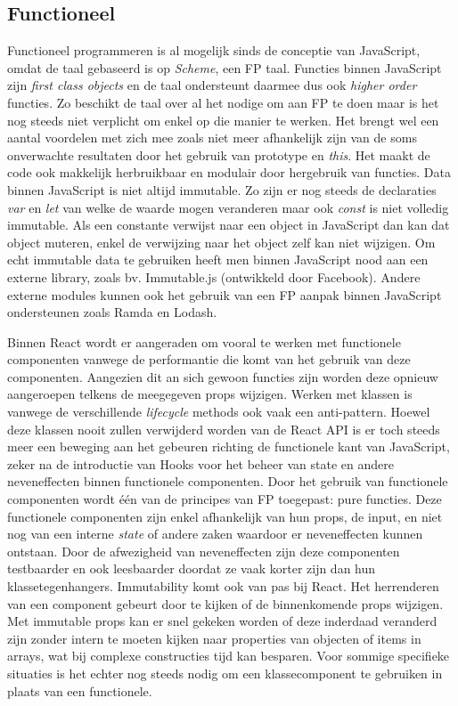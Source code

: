 \subsection{Functioneel}
Functioneel programmeren is al mogelijk sinds de conceptie van JavaScript, omdat de taal gebaseerd is op \textit{Scheme}, een FP taal. Functies binnen JavaScript zijn \textit{first class objects} en de taal ondersteunt daarmee dus ook \textit{higher order} functies. Zo beschikt de taal over al het nodige om aan FP te doen maar is het nog steeds niet verplicht om enkel op die manier te werken. Het brengt wel een aantal voordelen met zich mee zoals niet meer afhankelijk zijn van de soms onverwachte resultaten door het gebruik van prototype en \textit{this}. Het maakt de code ook makkelijk herbruikbaar en modulair door hergebruik van functies. Data binnen JavaScript is niet altijd immutable. Zo zijn er nog steeds de declaraties \textit{var} en \textit{let} van welke de waarde mogen veranderen maar ook \textit{const} is niet volledig immutable. Als een constante verwijst naar een object in JavaScript dan kan dat object muteren, enkel de verwijzing naar het object zelf kan niet wijzigen. Om echt immutable data te gebruiken heeft men binnen JavaScript nood aan een externe library, zoals bv. Immutable.js (ontwikkeld door Facebook). Andere externe modules kunnen ook het gebruik van een FP aanpak binnen JavaScript ondersteunen zoals Ramda en Lodash.

Binnen React wordt er aangeraden om vooral te werken met functionele componenten vanwege de performantie die komt van het gebruik van deze componenten. Aangezien dit an sich gewoon functies zijn worden deze opnieuw aangeroepen telkens de meegegeven props wijzigen. Werken met klassen is vanwege de verschillende \textit{lifecycle} methods ook vaak een anti-pattern. Hoewel deze klassen nooit zullen verwijderd worden van de React API is er toch steeds meer een beweging aan het gebeuren richting de functionele kant van JavaScript, zeker na de introductie van Hooks voor het beheer van state en andere neveneffecten binnen functionele componenten. Door het gebruik van functionele componenten wordt één van de principes van FP toegepast: pure functies. Deze functionele componenten zijn enkel afhankelijk van hun props, de input, en niet nog van een interne \textit{state} of andere zaken waardoor er neveneffecten kunnen ontstaan. Door de afwezigheid van neveneffecten zijn deze componenten testbaarder en ook leesbaarder doordat ze vaak korter zijn dan hun klassetegenhangers. Immutability komt ook van pas bij React. Het herrenderen van een component gebeurt door te kijken of de binnenkomende props wijzigen. Met immutable props kan er snel gekeken worden of deze inderdaad veranderd zijn zonder intern te moeten kijken naar properties van objecten of items in arrays, wat bij complexe constructies tijd kan besparen. Voor sommige specifieke situaties is het echter nog steeds nodig om een klassecomponent te gebruiken in plaats van een functionele.